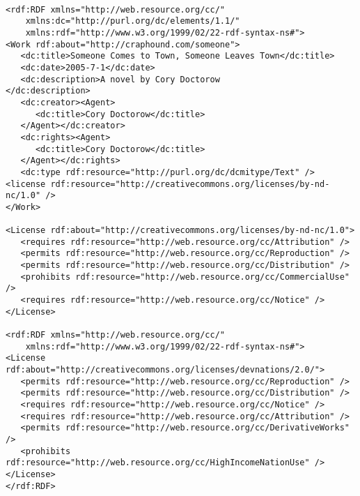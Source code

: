 \documentclass{article}
\begin{document}
\begin{verbatim}

<rdf:RDF xmlns="http://web.resource.org/cc/"
    xmlns:dc="http://purl.org/dc/elements/1.1/"
    xmlns:rdf="http://www.w3.org/1999/02/22-rdf-syntax-ns#">
<Work rdf:about="http://craphound.com/someone">
   <dc:title>Someone Comes to Town, Someone Leaves Town</dc:title>
   <dc:date>2005-7-1</dc:date>
   <dc:description>A novel by Cory Doctorow
</dc:description>
   <dc:creator><Agent>
      <dc:title>Cory Doctorow</dc:title>
   </Agent></dc:creator>
   <dc:rights><Agent>
      <dc:title>Cory Doctorow</dc:title>
   </Agent></dc:rights>
   <dc:type rdf:resource="http://purl.org/dc/dcmitype/Text" />
<license rdf:resource="http://creativecommons.org/licenses/by-nd-nc/1.0" />
</Work>

<License rdf:about="http://creativecommons.org/licenses/by-nd-nc/1.0">
   <requires rdf:resource="http://web.resource.org/cc/Attribution" />
   <permits rdf:resource="http://web.resource.org/cc/Reproduction" />
   <permits rdf:resource="http://web.resource.org/cc/Distribution" />
   <prohibits rdf:resource="http://web.resource.org/cc/CommercialUse" />
   <requires rdf:resource="http://web.resource.org/cc/Notice" />
</License>

<rdf:RDF xmlns="http://web.resource.org/cc/"
    xmlns:rdf="http://www.w3.org/1999/02/22-rdf-syntax-ns#">
<License rdf:about="http://creativecommons.org/licenses/devnations/2.0/">
   <permits rdf:resource="http://web.resource.org/cc/Reproduction" />
   <permits rdf:resource="http://web.resource.org/cc/Distribution" />
   <requires rdf:resource="http://web.resource.org/cc/Notice" />
   <requires rdf:resource="http://web.resource.org/cc/Attribution" />
   <permits rdf:resource="http://web.resource.org/cc/DerivativeWorks" />
   <prohibits rdf:resource="http://web.resource.org/cc/HighIncomeNationUse" />
</License>
</rdf:RDF>

\end{verbatim}
\end{document}
